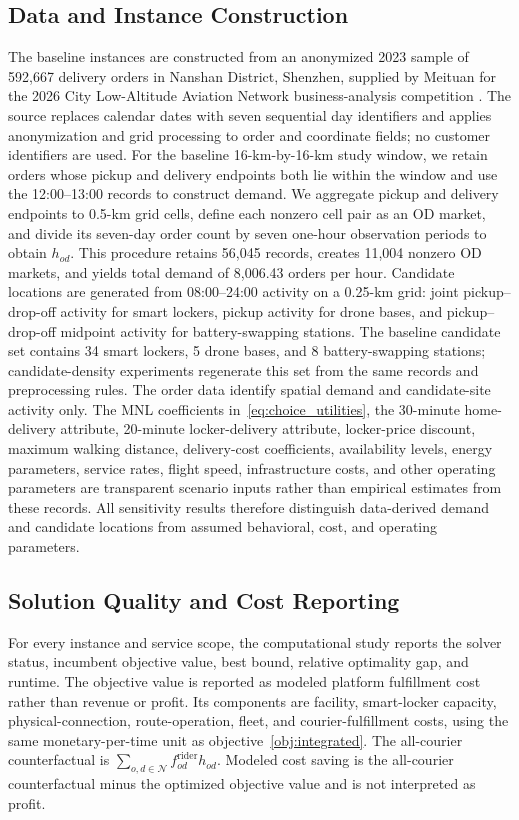 \documentclass[final,3p,authoryear]{elsarticle}
\begin{document}
\subsection{Data and Instance Construction}
\label{subsec:data_instances}

The baseline instances are constructed from an anonymized 2023 sample of 592,667 delivery orders in Nanshan District, Shenzhen, supplied by Meituan for the 2026 City Low-Altitude Aviation Network business-analysis competition \citep{Meituan2026NanshanDataset}.
The source replaces calendar dates with seven sequential day identifiers and applies anonymization and grid processing to order and coordinate fields; no customer identifiers are used.
For the baseline 16-km-by-16-km study window, we retain orders whose pickup and delivery endpoints both lie within the window and use the 12:00--13:00 records to construct demand.
We aggregate pickup and delivery endpoints to 0.5-km grid cells, define each nonzero cell pair as an OD market, and divide its seven-day order count by seven one-hour observation periods to obtain $h_{od}$.
This procedure retains 56,045 records, creates 11,004 nonzero OD markets, and yields total demand of 8,006.43 orders per hour.
Candidate locations are generated from 08:00--24:00 activity on a 0.25-km grid: joint pickup--drop-off activity for smart lockers, pickup activity for drone bases, and pickup--drop-off midpoint activity for battery-swapping stations.
The baseline candidate set contains 34 smart lockers, 5 drone bases, and 8 battery-swapping stations; candidate-density experiments regenerate this set from the same records and preprocessing rules.
The order data identify spatial demand and candidate-site activity only.
The MNL coefficients in~\eqref{eq:choice_utilities}, the 30-minute home-delivery attribute, 20-minute locker-delivery attribute, locker-price discount, maximum walking distance, delivery-cost coefficients, availability levels, energy parameters, service rates, flight speed, infrastructure costs, and other operating parameters are transparent scenario inputs rather than empirical estimates from these records.
All sensitivity results therefore distinguish data-derived demand and candidate locations from assumed behavioral, cost, and operating parameters.

\subsection{Solution Quality and Cost Reporting}

For every instance and service scope, the computational study reports the solver status, incumbent objective value, best bound, relative optimality gap, and runtime.
The objective value is reported as modeled platform fulfillment cost rather than revenue or profit.
Its components are facility, smart-locker capacity, physical-connection, route-operation, fleet, and courier-fulfillment costs, using the same monetary-per-time unit as objective~\eqref{obj:integrated}.
The all-courier counterfactual is $\sum_{o,d\in\mathcal N}f_{od}^{\mathrm{rider}}h_{od}$.
Modeled cost saving is the all-courier counterfactual minus the optimized objective value and is not interpreted as profit.
\end{document}

